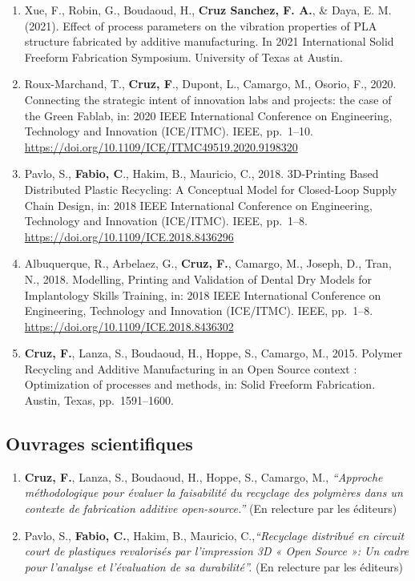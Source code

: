 \documentclass[
  12pt,
  oneside]{book}
\begin{document}
\begin{enumerate}
\def\labelenumi{\arabic{enumi}.}
\item
  Xue, F., Robin, G., Boudaoud, H., \textbf{Cruz Sanchez, F. A.}, \& Daya, E. M. (2021). Effect of process parameters on the vibration properties of PLA structure fabricated by additive manufacturing. In 2021 International Solid Freeform Fabrication Symposium. University of Texas at Austin.
\item
  Roux-Marchand, T., \textbf{Cruz, F}., Dupont, L., Camargo, M., Osorio, F., 2020. Connecting the strategic intent of innovation labs and projects: the case of the Green Fablab, in: 2020 IEEE International Conference on Engineering, Technology and Innovation (ICE/ITMC). IEEE, pp.~1--10. \url{https://doi.org/10.1109/ICE/ITMC49519.2020.9198320}
\item
  Pavlo, S., \textbf{Fabio, C}., Hakim, B., Mauricio, C., 2018. 3D-Printing Based Distributed Plastic Recycling: A Conceptual Model for Closed-Loop Supply Chain Design, in: 2018 IEEE International Conference on Engineering, Technology and Innovation (ICE/ITMC). IEEE, pp.~1--8. \url{https://doi.org/10.1109/ICE.2018.8436296}
\item
  Albuquerque, R., Arbelaez, G., \textbf{Cruz, F.}, Camargo, M., Joseph, D., Tran, N., 2018. Modelling, Printing and Validation of Dental Dry Models for Implantology Skills Training, in: 2018 IEEE International Conference on Engineering, Technology and Innovation (ICE/ITMC). IEEE, pp.~1--8. \url{https://doi.org/10.1109/ICE.2018.8436302}
\item
  \textbf{Cruz, F.}, Lanza, S., Boudaoud, H., Hoppe, S., Camargo, M., 2015. Polymer Recycling and Additive Manufacturing in an Open Source context : Optimization of processes and methods, in: Solid Freeform Fabrication. Austin, Texas, pp.~1591--1600.
\end{enumerate}

\hypertarget{ouvrages-scientifiques}{%
\subsection{Ouvrages scientifiques}\label{ouvrages-scientifiques}}

\begin{enumerate}
\def\labelenumi{\arabic{enumi}.}
\item
  \textbf{Cruz, F.}, Lanza, S., Boudaoud, H., Hoppe, S., Camargo, M., \emph{``Approche méthodologique pour évaluer la faisabilité du recyclage des polymères dans un contexte de fabrication additive open-source.''} (En relecture par les éditeurs)
\item
  Pavlo, S., \textbf{Fabio, C.}, Hakim, B., Mauricio, C.,\emph{``Recyclage distribué en circuit court de plastiques revalorisés par l'impression 3D « Open Source »: Un cadre pour l'analyse et l'évaluation de sa durabilité''.} (En relecture par les éditeurs)
\end{enumerate}
\end{document}
